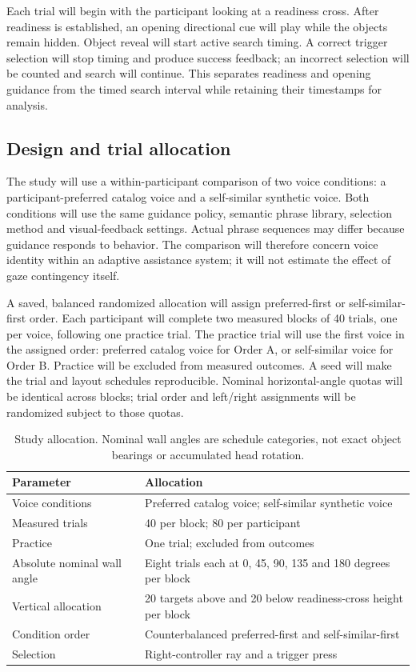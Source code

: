 \documentclass[11pt,letterpaper]{article}
\begin{document}
Each trial will begin with the participant looking at a readiness cross. After readiness is established, an opening directional cue will play while the objects remain hidden. Object reveal will start active search timing. A correct trigger selection will stop timing and produce success feedback; an incorrect selection will be counted and search will continue. This separates readiness and opening guidance from the timed search interval while retaining their timestamps for analysis.

\subsection{Design and trial allocation}
The study will use a within-participant comparison of two voice conditions: a participant-preferred catalog voice and a self-similar synthetic voice. Both conditions will use the same guidance policy, semantic phrase library, selection method and visual-feedback settings. Actual phrase sequences may differ because guidance responds to behavior. The comparison will therefore concern voice identity within an adaptive assistance system; it will not estimate the effect of gaze contingency itself.

A saved, balanced randomized allocation will assign preferred-first or self-similar-first order. Each participant will complete two measured blocks of 40 trials, one per voice, following one practice trial. The practice trial will use the first voice in the assigned order: preferred catalog voice for Order A, or self-similar voice for Order B. Practice will be excluded from measured outcomes. A seed will make the trial and layout schedules reproducible. Nominal horizontal-angle quotas will be identical across blocks; trial order and left/right assignments will be randomized subject to those quotas.

\begin{table}[htbp]\centering
\caption{Study allocation. Nominal wall angles are schedule categories, not exact object bearings or accumulated head rotation.}
\begin{tabularx}{\linewidth}{@{}lX@{}}\toprule
Parameter & Allocation \\\midrule
Voice conditions & Preferred catalog voice; self-similar synthetic voice \\
Measured trials & 40 per block; 80 per participant \\
Practice & One trial; excluded from outcomes \\
Absolute nominal wall angle & Eight trials each at 0, 45, 90, 135 and 180 degrees per block \\
Vertical allocation & 20 targets above and 20 below readiness-cross height per block \\
Condition order & Counterbalanced preferred-first and self-similar-first \\
Selection & Right-controller ray and a trigger press \\\bottomrule
\end{tabularx}
\end{table}
\end{document}
